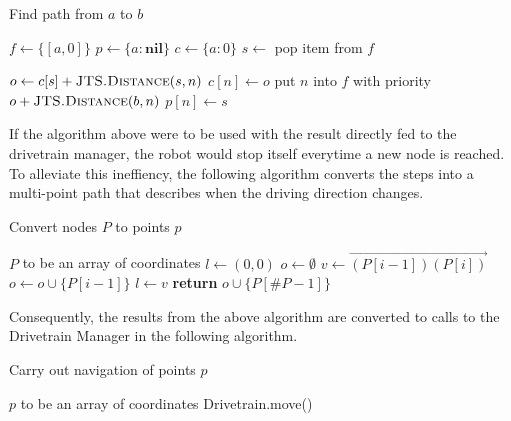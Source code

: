 \documentclass{article}
\begin{document}
\begin{algorithm}[H]
    \caption{Find path from $a$ to $b$}
    \begin{algorithmic}[1]
            \State $f \gets \{[a, 0]\}$ 
            \State $p \gets \{a: \mathrm{\textbf{nil}}\}$ 
            \State $c \gets \{a: 0\}$ 
                \State $s \gets $ pop item from $f$ 

                    \State \Return {} 
                \EndIf

                 
                    \State $o \gets c[s]+\Call{JTS.Distance}{s,n}$ 
                     
                        \State $c[n] \gets o$
                        \State put $n$ into $f$ with priority $o+\Call{JTS.Distance}{b,n}$
                        \State $p[n] \gets s$
                    \EndIf
                \EndFor
            \EndWhile
        \EndProcedure
    \end{algorithmic}
\end{algorithm}

 If the algorithm above were to be used with the result directly fed to the drivetrain manager, the robot would stop itself everytime a new node is reached. To alleviate this ineffiency, the following algorithm converts the steps into a multi-point path that describes when the driving direction changes.

\begin{algorithm}[H]
	\caption{Convert nodes $P$ to points $p$}
	\begin{algorithmic}[1]
		\Require $P$ to be an array of coordinates
			\State $l \gets (0,0)$ 
			\State $o \gets \emptyset$ 
			\For{$i$ \textbf{in} $[1,\#P)$} 
				\State $v \gets \overrightarrow{(P[i-1])(P[i])}$ 
					\State $o \gets o \cup \{P[i-1]\}$
					\State $l \gets v$
				\EndIf
			\EndFor
			\State \textbf{return} $o \cup \{P[\#P-1]\}$
		\EndProcedure
	\end{algorithmic}
\end{algorithm}

Consequently, the results from the above algorithm are converted to calls to the Drivetrain Manager in the following algorithm.

\begin{algorithm}[H]
	\caption{Carry out navigation of points $p$}
	\begin{algorithmic}[1]
		\Require $p$ to be an array of coordinates
			\For{$i$ \textbf{in} $[1,\#p)$} 
				\State Drivetrain.move()
			\EndFor
		\EndProcedure
	\end{algorithmic}
\end{algorithm}
			
\end{document}

